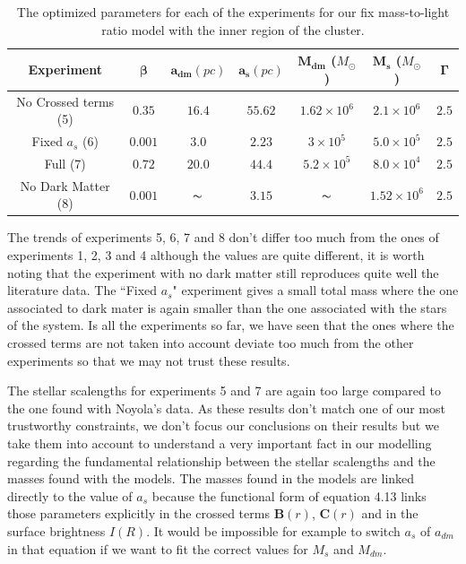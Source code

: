 \begin{table}[H]
\centering
\begin{tabular}{| c| c| c| c| c| c| c|}
    \hline
    \textbf{Experiment} & $\mathbf{\beta}$ & $\mathbf{a_{dm}} (pc)$ & $\mathbf{a_{s}} (pc)$ & $\mathbf{M_{dm}}$ ($M_{\odot}$) & $\mathbf{M_{s}}$ ($M_{\odot}$) & $\mathbf{\Gamma}$\\ \hline
	No Crossed terms (5) & $0.35$ &	$16.4$ &	$55.62$ &	$1.62 \times 10^{6}$ &	$2.1 \times 10^{6}$ &	$2.5$\\ \hline
	Fixed $a_s$ (6) &	$0.001$ &	$3.0$ &	$\mathbf{2.23}$ &	$3 \times 10^{5}$ &	$5.0 \times 10 ^{5}$ &	$2.5$\\ \hline
	Full (7) &	$0.72$ &	$20.0$ &	$44.4$ &	$5.2 \times 10^{5}$ &	$8.0 \times 10^{4}$ &	$2.5$\\ \hline
	No Dark Matter (8) &	$0.001$ &	$\thicksim$ & $ 3.15$ &	$\thicksim$ & $ 1.52 \times 10^{6}$ & 	$2.5$\\
    \hline
  \end{tabular} 
\caption[Optimized parameters for our fix mass-to-light ratio model with the inner region.]{The optimized parameters for each of the experiments for our fix mass-to-light ratio model with the inner region of the cluster.}
\end{table}

The trends of experiments 5, 6, 7 and 8 don't differ too much from the ones of experiments 1, 2, 3 and 4 although the values are quite different, it is worth noting that the experiment with no dark matter still reproduces quite well the literature data. The ``Fixed $a_s$" experiment gives a small total mass where the one associated to dark mater is again smaller than the one associated with the stars of the system. Is all the experiments so far, we have seen that the ones where the crossed terms are not taken into account deviate too much from the other experiments so that we may not trust these results. 

The stellar scalengths for experiments 5 and 7 are again too large compared to the one found with Noyola's data. As these results don't match one of our most trustworthy constraints, we don't focus our conclusions on their results but we take them into account to understand a very important fact in our modelling regarding the fundamental relationship between the stellar scalengths and the masses found with the models. The masses found in the models are linked directly to the value of $a_s$ because the functional form of equation 4.13 links those parameters explicitly in the crossed terms $\mathbf{B}(r)$, $\mathbf{C}(r)$ and in the surface brightness $I(R)$. It would be impossible for example to switch $a_s$ of $a_{dm}$ in that equation if we want to fit the correct values for $M_s$ and $M_{dm}$. 

